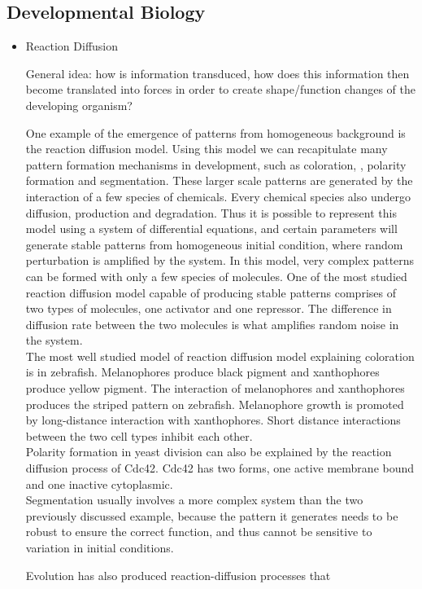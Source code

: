 \documentclass[fleqn,10pt]{wlscirep}
\begin{document}
\subsection*{Developmental Biology}
\begin{itemize}
\item{Reaction Diffusion} 

General idea: how is information transduced, how does this information then become translated into forces in order to create shape/function changes of the developing organism?

One example of the emergence of patterns from homogeneous background is the reaction diffusion model. Using this model we can recapitulate many pattern formation mechanisms in development, such as coloration, , polarity formation and segmentation. These larger scale patterns are generated by the interaction of a few species of chemicals. Every chemical species also  undergo diffusion, production and degradation. Thus it is possible to represent this model using a system of differential equations, and certain parameters will generate stable patterns from homogeneous initial condition, where random perturbation is amplified by the system. In this model, very complex patterns can be formed with only a few species of molecules\cite{kondo2010reaction}. One of the most studied reaction diffusion model capable of producing stable patterns comprises of two types of molecules, one activator and one repressor. The difference in diffusion rate between the two molecules is what amplifies random noise in the system.\cite{gierer1972theory}\\ 

The most well studied model of reaction diffusion model explaining coloration is in zebrafish. Melanophores produce black pigment and xanthophores produce yellow pigment.\cite{nakamasu2009interactions} The interaction of melanophores and xanthophores produces the striped pattern on zebrafish. Melanophore growth is promoted by long-distance interaction with xanthophores. Short distance interactions between the two cell types inhibit each other. \\

Polarity formation in yeast division can also be explained by the reaction diffusion process of Cdc42. Cdc42 has two forms, one active membrane bound and one inactive cytoplasmic.  \cite{goryachev2008dynamics} \\

Segmentation usually involves a more complex system than the two previously discussed example, because the pattern it generates needs to be robust to ensure the correct function, and thus cannot be sensitive to variation in initial conditions. 

Evolution has also produced reaction-diffusion processes that 
\end{itemize}
\end{document}
